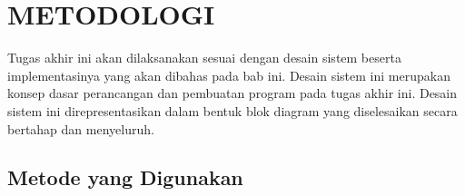\chapter{METODOLOGI}
\label{chap:metodologi}






Tugas akhir ini akan dilaksanakan sesuai dengan desain sistem beserta implementasinya yang akan dibahas pada bab ini. Desain sistem ini merupakan konsep dasar perancangan dan pembuatan program pada tugas akhir ini. Desain sistem ini direpresentasikan dalam bentuk blok diagram yang diselesaikan secara bertahap dan menyeluruh.

\section{Metode yang Digunakan}

